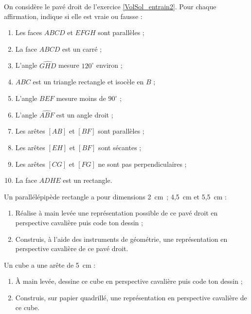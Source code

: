 \begin{exercice}
On considère le pavé droit de l'exercice \ref{VolSol_entrain2}. Pour chaque affirmation, indique si elle est vraie ou fausse :
\begin{enumerate}
 \item Les faces $ABCD$ et $EFGH$ sont parallèles ;
 \item La face $ABCD$ est un carré ;
 \item L'angle $\widehat{GHD}$ mesure $120^\circ$ environ ;
 \item $ABC$ est un triangle rectangle et isocèle en $B$ ;
 \item L'angle $\widehat{BEF}$ mesure moins de $90^\circ$ ;
 \item L'angle $\widehat{ABF}$ est un angle droit ;
 \item Les arêtes $[AB]$ et $[BF]$ sont parallèles ;
 \item Les arêtes $[EH]$ et $[BF]$ sont sécantes ;
 \item Les arêtes $[CG]$ et $[FG]$ ne sont pas perpendiculaires ;
 \item La face $ADHE$ est un rectangle.
 \end{enumerate}
\end{exercice}


\begin{exercice}
Un parallélépipède rectangle a pour dimensions 2 cm ; 4,5 cm et 5,5 cm :
\begin{enumerate}
 \item Réalise à main levée une représentation possible de ce pavé droit en perspective cavalière puis code ton dessin ;
 \item Construis, à l'aide des instruments de géométrie, une représentation en perspective cavalière de ce pavé droit.
 \end{enumerate}
\end{exercice}


\begin{exercice}
Un cube a une arête de 5 cm :
\begin{enumerate}
 \item À main levée, dessine ce cube en perspective cavalière puis code ton dessin ;
 \item Construis, sur papier quadrillé, une représentation en perspective cavalière de ce cube.
 \end{enumerate}
\end{exercice}


